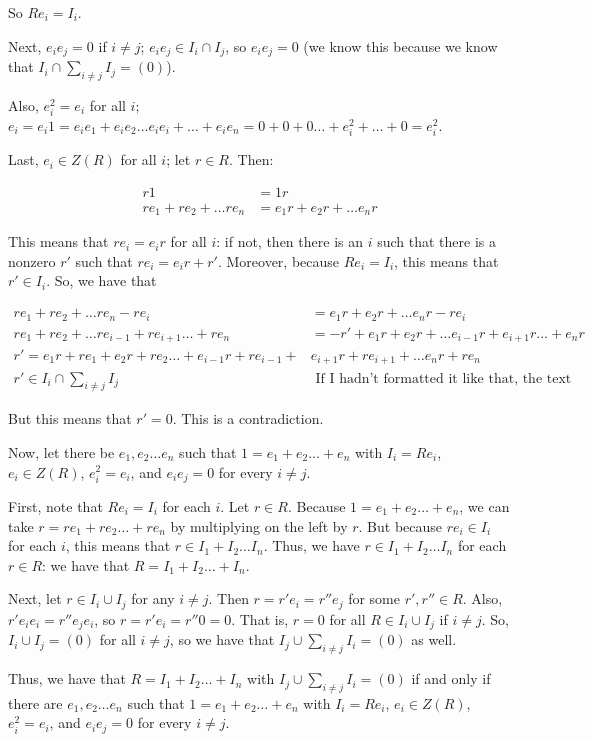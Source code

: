 \documentclass[a4paper,12pt]{article}
\newcommand{\tab}{\hspace{4mm}} %
\newcommand{\shunt}{\vspace{20mm}}
\begin{document}
\tab \tab So $Re_i = I_i$.

\tab Next, $e_ie_j = 0$ if $i \neq j$; $e_ie_j \in I_i \cap I_j$, so $e_ie_j = 0$ (we know this because we know that $I_i \cap \sum\limits_{i \neq j} I_j = (0)$).

\tab Also, $e_i^2 = e_i$ for all $i$; $e_i = e_i1= e_ie_1+e_ie_2 \ldots e_ie_i +\ldots + e_ie_n = 0+0+0\ldots+e_i^2+\ldots+0 = e_i^2$. 

\tab Last, $e_i \in Z(R)$ for all $i$; let $r \in R$. Then:

\begin{align*}
r1&=1r\\
re_1+re_2+\ldots re_n &=e_1r+e_2r+\ldots e_nr
\end{align*}

\tab This means that $re_i=e_ir$ for all $i$: if not, then there is an $i$ such that there is a nonzero $r'$ such that $re_i = e_ir + r'$. Moreover, because $Re_i=I_i$, this means that $r' \in I_i$. So, we have that

\begin{align*}
re_1+re_2+\ldots re_n -re_i &=e_1r+e_2r+\ldots e_nr - re_i\\
re_1+re_2+\ldots re_{i-1} + re_{i+1} \ldots +re_n &= -r' + e_1r+e_2r+\ldots e_{i-1}r + e_{i+1}r \ldots +e_nr\\
r' = e_1r + re_1 + e_2r + re_2 \ldots + e_{i-1}r + re_{i-1} + &e_{i+1}r + re_{i+1} + \ldots e_nr + re_n\\
r' \in I_i \cap \sum\limits_{i \neq j} I_j &\text{ If I hadn't formatted it like that, the text would run off the page}
\end{align*}

\tab But this means that $r' =0$. This is a contradiction. 

Now, let there be $e_1, e_2 \ldots e_n$ such that $1 = e_1 + e_2 \ldots +e_n$ with $I_i = Re_i$, $e_i \in Z(R)$, $e_i^2 = e_i$, and $e_ie_j = 0$ for every $i \neq j$.

\tab First, note that $Re_i = I_i$ for each $i$. Let $r \in R$. Because $1 = e_1 + e_2 \ldots +e_n$, we can take $r =re_1 + re_2 \ldots + re_n$ by multiplying on the left by $r$. But because $re_i \in I_i$ for each $i$, this means that $r \in I_1 + I_2 \ldots I_n$. Thus, we have $r \in I_1 + I_2 \ldots I_n$ for each $r \in R$: we have that $R = I_1 + I_2 \ldots +I_n$.

\tab Next, let $r \in I_i \cup I_j$ for any $i \neq j$. Then $r = r'e_i=r''e_j$ for some $r',r'' \in R$. Also, $r'e_ie_i=r''e_je_i$, so $r=r'e_i = r''0=0$. That is, $r=0$ for all $R \in I_i \cup I_j$ if $i \neq j$. So, $I_i \cup I_j = (0)$ for all $i \neq j$, so we have that $I_j \cup \sum\limits_{i \neq j} I_i = (0)$ as well.

Thus, we have that $R = I_1 +I_2 \ldots + I_n$ with $I_j \cup \sum\limits_{i \neq j} I_i = (0)$ if and only if there are $e_1, e_2 \ldots e_n$ such that $1 = e_1 + e_2 \ldots +e_n$ with $I_i = Re_i$, $e_i \in Z(R)$, $e_i^2 = e_i$, and $e_ie_j = 0$ for every $i \neq j$.

\shunt
\end{document}
